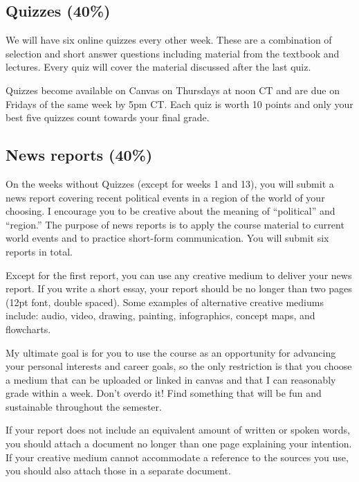 \documentclass[
  11pt,
]{article}
\begin{document}
\hypertarget{quizzes-40}{%
\subsection{Quizzes (40\%)}\label{quizzes-40}}

We will have six online quizzes every other week. These are a
combination of selection and short answer questions including material
from the textbook and lectures. Every quiz will cover the material
discussed after the last quiz.

Quizzes become available on Canvas on Thursdays at noon CT and are due
on Fridays of the same week by 5pm CT. Each quiz is worth 10 points and
only your best five quizzes count towards your final grade.

\hypertarget{news-reports-40}{%
\subsection{News reports (40\%)}\label{news-reports-40}}

On the weeks without Quizzes (except for weeks 1 and 13), you will
submit a news report covering recent political events in a region of the
world of your choosing. I encourage you to be creative about the meaning
of ``political'' and ``region.'' The purpose of news reports is to apply
the course material to current world events and to practice short-form
communication. You will submit six reports in total.

Except for the first report, you can use any creative medium to deliver
your news report. If you write a short essay, your report should be no
longer than two pages (12pt font, double spaced). Some examples of
alternative creative mediums include: audio, video, drawing, painting,
infographics, concept maps, and flowcharts.

My ultimate goal is for you to use the course as an opportunity for
advancing your personal interests and career goals, so the only
restriction is that you choose a medium that can be uploaded or linked
in canvas and that I can reasonably grade within a week. Don't overdo
it! Find something that will be fun and sustainable throughout the
semester.

If your report does not include an equivalent amount of written or
spoken words, you should attach a document no longer than one page
explaining your intention. If your creative medium cannot accommodate a
reference to the sources you use, you should also attach those in a
separate document.
\end{document}

